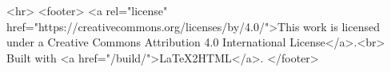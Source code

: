 \begin{rawhtml}
<hr>
<footer>
  <a rel="license" href="https://creativecommons.org/licenses/by/4.0/">This work is licensed under a Creative Commons Attribution 4.0 International License</a>.<br>
  Built with <a href="/build/">LaTeX2HTML</a>.
</footer>
\end{rawhtml}
